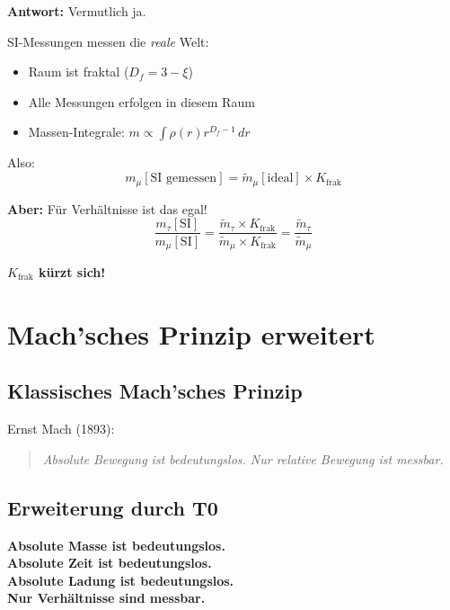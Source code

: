 \textbf{Antwort:} Vermutlich ja.

SI-Messungen messen die \textit{reale} Welt:
\begin{itemize}[nosep]
	\item Raum ist fraktal ($D_f = 3 - \xi$)
	\item Alle Messungen erfolgen in diesem Raum
	\item Massen-Integrale: $m \propto \int \rho(r) r^{D_f-1} \, dr$
\end{itemize}

Also:
\begin{equation}
	m_\mu[\text{SI gemessen}] = \tilde{m}_\mu[\text{ideal}] \times K_\text{frak}
\end{equation}

\textbf{Aber:} Für Verhältnisse ist das egal!
\begin{equation}
	\frac{m_\tau[\text{SI}]}{m_\mu[\text{SI}]} = \frac{\tilde{m}_\tau \times K_\text{frak}}{\tilde{m}_\mu \times K_\text{frak}} = \frac{\tilde{m}_\tau}{\tilde{m}_\mu}
\end{equation}

\textbf{$K_\text{frak}$ kürzt sich!}

\section{Mach'sches Prinzip erweitert}

\subsection{Klassisches Mach'sches Prinzip}

Ernst Mach (1893):
\begin{quote}
	\textit{Absolute Bewegung ist bedeutungslos. Nur relative Bewegung ist messbar.}
\end{quote}

\subsection{Erweiterung durch T0}

\begin{theorem}
	\textbf{Absolute Masse ist bedeutungslos.} \\
	\textbf{Absolute Zeit ist bedeutungslos.} \\
	\textbf{Absolute Ladung ist bedeutungslos.} \\
	\textbf{Nur Verhältnisse sind messbar.}
\end{theorem}


